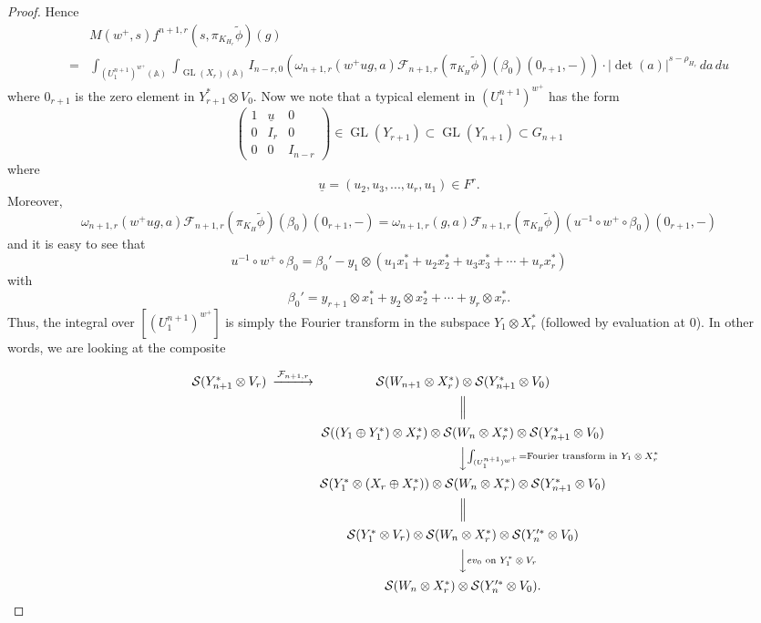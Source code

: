 \documentclass[10pt]{amsart}
\theoremstyle{plain}
\numberwithin{equation}{section}
\begin{document}
\begin{proof}
Hence
 \begin{align*}
 & M(w^+,s) f^{n+1,r}(s, \pi_{K_{H_r}} \tilde{\phi}) (g)\\
=&\int_{(U^{n+1}_1)^{w^+}({\mathbb{A}})}  
  \int_{{\operatorname{GL}}(X_r)({\mathbb{A}})}    I_{n-r,0}( \omega_{n+1,r}(w^+ u g,a)
  \mathcal{F}_{n+1,r}(\pi_{K_H} \tilde{\phi})(\beta_0 )(0_{r+1}, -) )
  \cdot |\det (a)|^{s-\rho_{H_r}} \,da\, du 
\end{align*}
where $0_{r+1}$ is the zero element in $Y_{r+1}^* \otimes V_0$.
Now we note that a typical element in
$(U^{n+1}_1)^{w^+}$ has the form
\[  \left( \begin{array}{ccc}
1 &  \underline{u} & 0 \\
0 &   I_r & 0 \\
  0 & 0 &   I_{n-r} \end{array} \right)  \in {\operatorname{GL}}(Y_{r+1}) \subset {\operatorname{GL}}(Y_{n+1}) \subset G_{n+1} \]
where 
\[  \underline{u} = (u_2, u_3,...,u_r, u_1) \in F^r. \]
Moreover, 
\[  \omega_{n+1,r}(w^+ u g,a) \mathcal{F}_{n+1,r}(\pi_{K_H}
\tilde{\phi})(\beta_0 )(0_{r+1},-)  
=  \omega_{n+1,r}(g,a)\mathcal{F}_{n+1,r}(\pi_{K_H} \tilde{\phi})(
u^{-1} \circ  w^+ \circ  \beta_0 )(0_{r+1},-) \]
and it is easy to see that
\[ u^{-1} \circ  w^+ \circ  \beta_0  = \beta_0' 
 - y_1 \otimes \left( u_1x_1^* + u_2 x_2^*  + u_3 x_3^* +\cdots+ u_r x_r^*\right) \]
 with
 \[  \beta_0' = y_{r+1} \otimes x_1^* + y_2 \otimes x_2^* +\cdots+ y_r \otimes x_r^*. \]
Thus, the integral over $[(U^{n+1}_1)^{w^+}]$ is simply the Fourier transform in the subspace 
$Y_1 \otimes X_r^*$ (followed by evaluation at $0$). In other words, we
are looking at the composite
\vskip 5pt

\[  \begin{CD}
\mathcal{S}(Y_{n+1}^* \otimes V_r) @>\mathcal{F}_{n+1,r}>>
\mathcal{S}(W_{n+1}\otimes X_r^*)\otimes \mathcal{S}(Y_{n+1}^*
\otimes V_0)\\
& &@|  \\
& & \mathcal{S}((Y_1 \oplus Y_1^*) \otimes X_r^*) \otimes  \mathcal{S}(W_n \otimes  X_r^*) \otimes \mathcal{S}(Y_{n+1}^* \otimes V_0) \\
&  &@VV\int_{(U^{n+1}_1)^{w^+}} = \text{Fourier transform in $Y_1 \otimes X_r^*$}V  \\
& &  \mathcal{S}(Y_1^* \otimes (X_r \oplus X_r^*))  \otimes  \mathcal{S}(W_n \otimes  X_r^*) \otimes \mathcal{S}(Y_{n+1}^* \otimes V_0) \\
& & @| \\
&   & \mathcal{S}(Y_1^* \otimes V_r)\otimes \mathcal{S}(W_n \otimes
X_r^*)\otimes \mathcal{S}(Y_n'^* \otimes V_0)\\
& & @VVev_0 \text{ on $Y_1^* \otimes V_r$}V \\
& &  \mathcal{S}(W_n\otimes X_r^*)\otimes \mathcal{S}(Y_n'^*
\otimes V_0). 
 \end{CD} \]
\vskip 5pt


\end{proof}
\end{document}
